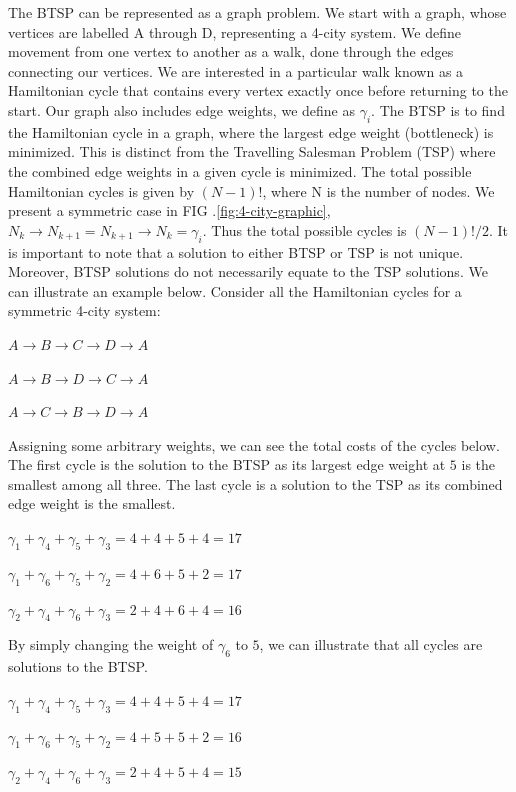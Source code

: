 \documentclass[twocolumn,showpacs,preprintnumbers,amsmath,amssymb]{revtex4}
\begin{document}
		The BTSP can be represented as a graph problem.  We start with a graph, whose vertices are labelled A through D, representing a 4-city system. We define movement from one vertex to another as a walk, done through the edges connecting our vertices. We are interested in a particular walk known as a Hamiltonian cycle that contains every vertex exactly once before returning to the start. Our graph also includes edge weights, we define as $ \gamma_i $.
		The BTSP is to find the Hamiltonian cycle in a graph, where the largest edge weight (bottleneck) is minimized. This is distinct from the Travelling Salesman Problem (TSP) where the combined edge weights in a given cycle is minimized. The total possible Hamiltonian cycles is given by $(N-1)!$, where N is the number of nodes. We present a symmetric case in FIG .\ref{fig:4-city-graphic},  $N_k \rightarrow N_{k+1} = N_{k+1} \rightarrow N_{k} = \gamma_i$. Thus the total possible cycles is  $(N-1)!/2$.  It is important to note that a solution to either BTSP or TSP is not unique. Moreover, BTSP solutions do not necessarily equate to the TSP solutions. We can illustrate an example below. Consider all the Hamiltonian cycles for a symmetric 4-city system:
		
		\begin{center}
		$ A \rightarrow B \rightarrow C \rightarrow D \rightarrow A $
		
		$ A \rightarrow B \rightarrow D \rightarrow C \rightarrow A $ 
		
		$ A \rightarrow C \rightarrow B \rightarrow D \rightarrow A $
	    \end{center}
		
		Assigning some arbitrary weights, we can see the total costs of the cycles below. The first cycle is the solution to the BTSP as its largest edge weight at $5$ is the smallest among all three. The last cycle is a solution to the TSP as its combined edge weight is the smallest.
		\begin{center}
		$\gamma_1 + \gamma_4 + \gamma_5 + \gamma_3 = 4 + 4 + 5 + 4 = 17$
		
		$ \gamma_1 + \gamma_6 + \gamma_5 + \gamma_2 = 4 + 6 + 5 + 2 = 17$
		
		$  \gamma_2 + \gamma_4 + \gamma_6 + \gamma_3 = 2 + 4 + 6 + 4 = 16$
		\end{center}
		

		By simply changing the weight of $\gamma_6$ to $5$, we can illustrate that all cycles are solutions to the BTSP. 
		
		\begin{center}

			$\gamma_1 + \gamma_4 + \gamma_5 + \gamma_3 = 4 + 4 + 5 + 4 = 17$
			
			$ \gamma_1 + \gamma_6 + \gamma_5 + \gamma_2 = 4 + 5 + 5 + 2 = 16$
			
			$  \gamma_2 + \gamma_4 + \gamma_6 + \gamma_3 = 2 + 4 + 5 + 4 = 15$
		\end{center}
		
\end{document}
